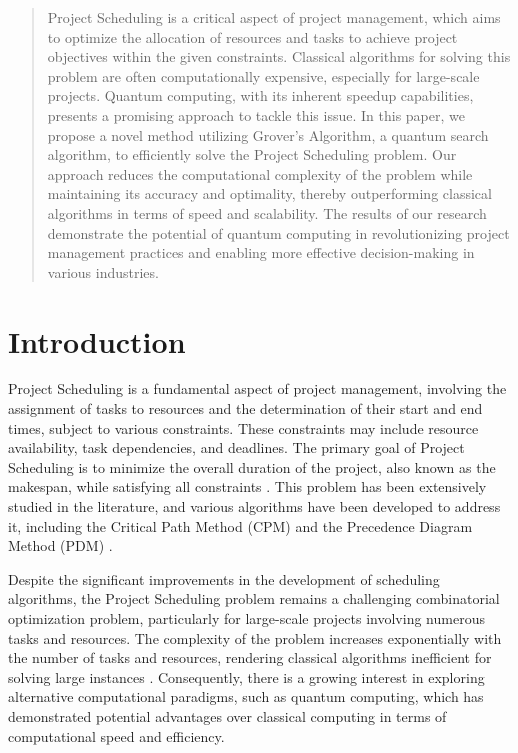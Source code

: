 \begin{abstract}
Project Scheduling is a critical aspect of project management, which aims to optimize the allocation of resources and tasks to achieve project objectives within the given constraints. Classical algorithms for solving this problem are often computationally expensive, especially for large-scale projects. Quantum computing, with its inherent speedup capabilities, presents a promising approach to tackle this issue. In this paper, we propose a novel method utilizing Grover's Algorithm, a quantum search algorithm, to efficiently solve the Project Scheduling problem. Our approach reduces the computational complexity of the problem while maintaining its accuracy and optimality, thereby outperforming classical algorithms in terms of speed and scalability. The results of our research demonstrate the potential of quantum computing in revolutionizing project management practices and enabling more effective decision-making in various industries.

\end{abstract}

\section{Introduction}

Project Scheduling is a fundamental aspect of project management, involving the assignment of tasks to resources and the determination of their start and end times, subject to various constraints. These constraints may include resource availability, task dependencies, and deadlines. The primary goal of Project Scheduling is to minimize the overall duration of the project, also known as the makespan, while satisfying all constraints \cite{pinedo2012scheduling}. This problem has been extensively studied in the literature, and various algorithms have been developed to address it, including the Critical Path Method (CPM) and the Precedence Diagram Method (PDM) \cite{kelley1961critical, fondahl1961non}.

Despite the significant improvements in the development of scheduling algorithms, the Project Scheduling problem remains a challenging combinatorial optimization problem, particularly for large-scale projects involving numerous tasks and resources. The complexity of the problem increases exponentially with the number of tasks and resources, rendering classical algorithms inefficient for solving large instances \cite{kolisch2006survey}. Consequently, there is a growing interest in exploring alternative computational paradigms, such as quantum computing, which has demonstrated potential advantages over classical computing in terms of computational speed and efficiency.

